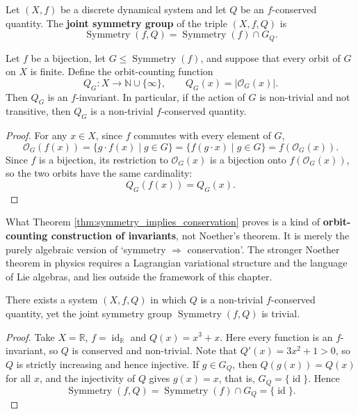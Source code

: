 \begin{definition}\label{def:joint_symmetry}
Let $(X,f)$ be a discrete dynamical system and let $Q$ be an $f$-conserved quantity. The \textbf{joint symmetry group} of the triple $(X,f,Q)$ is
\[
\operatorname{Symmetry}(f,Q)=\operatorname{Symmetry}(f)\cap G_Q.
\]
\end{definition}

\begin{theorem}\label{thm:symmetry_implies_conservation}
Let $f$ be a bijection, let $G\le\operatorname{Symmetry}(f)$, and suppose that every orbit of $G$ on $X$ is finite. Define the orbit-counting function
\[
Q_G:X\to\mathbb{N}\cup\{\infty\},\qquad Q_G(x)=|\mathcal{O}_G(x)|.
\]
Then $Q_G$ is an $f$-invariant. In particular, if the action of $G$ is non-trivial and not transitive, then $Q_G$ is a non-trivial $f$-conserved quantity.
\end{theorem}

\begin{proof}
For any $x\in X$, since $f$ commutes with every element of $G$,
\[
\mathcal{O}_G(f(x))=\{g\cdot f(x)\mid g\in G\}
=\{f(g\cdot x)\mid g\in G\}=f(\mathcal{O}_G(x)).
\]
Since $f$ is a bijection, its restriction to $\mathcal{O}_G(x)$ is a bijection onto $f(\mathcal{O}_G(x))$, so the two orbits have the same cardinality:
\[
Q_G(f(x))=Q_G(x).
\]
\end{proof}

\begin{remark}\label{rem:noether}
What Theorem \ref{thm:symmetry_implies_conservation} proves is a kind of \textbf{orbit-counting construction of invariants}, not Noether's theorem. It is merely the purely algebraic version of `symmetry $\Rightarrow$ conservation'. The stronger Noether theorem in physics requires a Lagrangian variational structure and the language of Lie algebras, and lies outside the framework of this chapter.
\end{remark}

\begin{proposition}\label{prop:conservation_not_symmetry}
There exists a system $(X,f,Q)$ in which $Q$ is a non-trivial $f$-conserved quantity, yet the joint symmetry group $\operatorname{Symmetry}(f,Q)$ is trivial.
\end{proposition}

\begin{proof}
Take $X=\mathbb{R}$, $f=\operatorname{id}_{\mathbb{R}}$ and $Q(x)=x^3+x$. Here every function is an $f$-invariant, so $Q$ is conserved and non-trivial. Note that $Q'(x)=3x^2+1>0$, so $Q$ is strictly increasing and hence injective. If $g\in G_Q$, then $Q(g(x))=Q(x)$ for all $x$, and the injectivity of $Q$ gives $g(x)=x$, that is, $G_Q=\{\operatorname{id}\}$. Hence
\[
\operatorname{Symmetry}(f,Q)=\operatorname{Symmetry}(f)\cap G_Q=\{\operatorname{id}\}.
\]
\end{proof}

